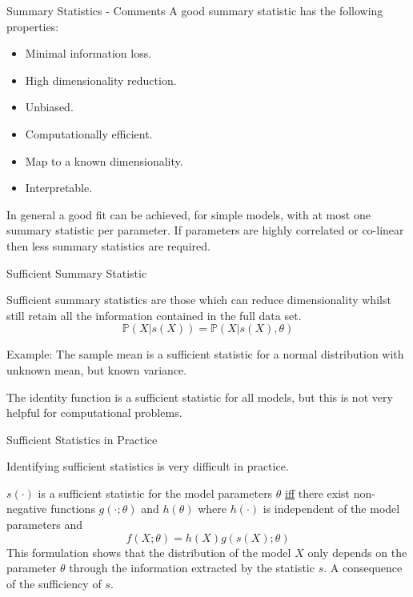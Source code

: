 \documentclass[aspectratio=169]{beamer}
\begin{document}
\begin{frame}{Summary Statistics - Comments}
  A good summary statistic has the following properties:
  \begin{multicols}{2}
    \begin{itemize}
      \item Minimal information loss.
      \item High dimensionality reduction.
      \item Unbiased.
      \item Computationally efficient.
      \item Map to a known dimensionality.
      \item Interpretable.
    \end{itemize}
  \end{multicols}
  In general a good fit can be achieved, for simple models, with at most one summary statistic per parameter. If parameters are highly correlated or co-linear then less summary statistics are required.
\end{frame}

\begin{frame}{Sufficient Summary Statistic}
  \par Sufficient summary statistics are those which can reduce dimensionality whilst still retain all the information contained in the full data set.
  \[ \mathbb{P}(X|s(X))=\mathbb{P}(X|s(X),\theta) \]
  \par Example: The sample mean is a sufficient statistic for a normal distribution with unknown mean, but known variance.
  \par The identity function is a sufficient statistic for all models, but this is not very helpful for computational problems.
\end{frame}

\begin{frame}{Sufficient Statistics in Practice}
  \par Identifying sufficient statistics is very difficult in practice.
  \begin{theorem}
    $s(\cdot)$ is a sufficient statistic for the model parameters $\theta$ \underline{iff} there exist non-negative functions $g(\cdot;\theta)$ and $h(\theta)$ where $h(\cdot)$ is independent of the model parameters\footnotemark{} and
    \[ f(X;\theta)=h(X)g(s(X);\theta) \]
    This formulation shows that the distribution of the model $X$ only depends on the parameter $\theta$ through the information extracted by the statistic $s$. A consequence of the sufficiency of $s$.
  \end{theorem}
\end{frame}
\end{document}

